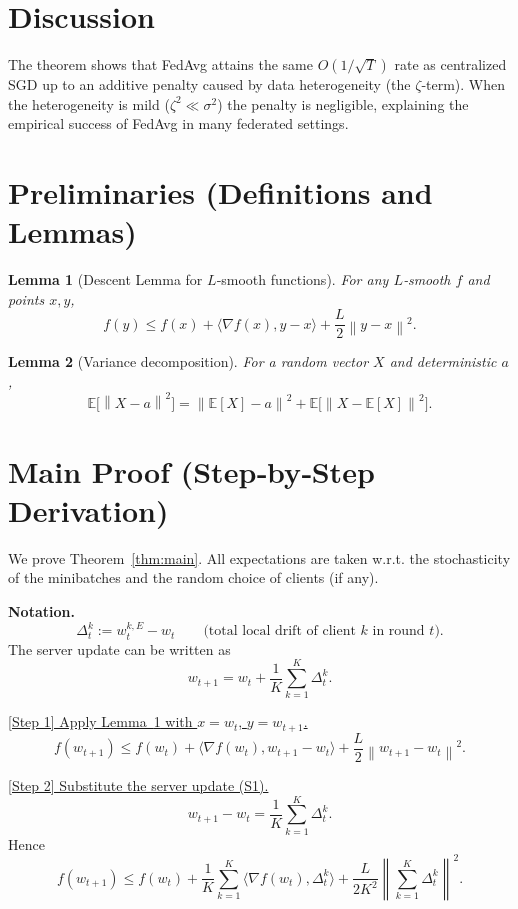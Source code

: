 \documentclass{article}
\newtheorem{lemma}{Lemma}
\newcommand{\E}{\mathbb{E}}
\newcommand{\norm}[1]{\left\|#1\right\|}
\newcommand{\ip}[2]{\langle #1,#2\rangle}
\begin{document}
\section*{Discussion}
The theorem shows that FedAvg attains the same $O(1/\sqrt{T})$ rate as centralized SGD up to an additive penalty caused by data heterogeneity (the $\zeta$‑term). When the heterogeneity is mild ($\zeta^2\ll\sigma^2$) the penalty is negligible, explaining the empirical success of FedAvg in many federated settings.

\newpage

\section*{Preliminaries (Definitions and Lemmas)}
\begin{lemma}[Descent Lemma for $L$‑smooth functions]\label{lem:descent}
For any $L$‑smooth $f$ and points $x,y$,
\[
    f(y)\le f(x)+\ip{\nabla f(x)}{y-x}+\frac{L}{2}\norm{y-x}^2 .
\]
\end{lemma}
\begin{lemma}[Variance decomposition]\label{lem:variance}
For a random vector $X$ and deterministic $a$,
\[
    \E\!\bigl[\norm{X-a}^2\bigr]=\norm{\E[X]-a}^2+\E\!\bigl[\norm{X-\E[X]}^2\bigr].
\]
\end{lemma}

\section*{Main Proof (Step‑by‑Step Derivation)}
We prove Theorem~\ref{thm:main}. All expectations are taken w.r.t. the stochasticity of the minibatches and the random choice of clients (if any).

\bigskip
\noindent\textbf{Notation.}
\[
    \Delta_t^{k}:=w_{t}^{k,E}-w_t
    \qquad\text{(total local drift of client $k$ in round $t$).}
\]
The server update can be written as
\[
    w_{t+1}=w_t+\frac{1}{K}\sum_{k=1}^{K}\Delta_t^{k}. \tag{S1}
\]

\bigskip
\noindent\underline{[Step 1] Apply Lemma~\ref{lem:descent} with $x=w_t$, $y=w_{t+1}$.}
\[
    f(w_{t+1})\le f(w_t)+\ip{\nabla f(w_t)}{w_{t+1}-w_t}
    +\frac{L}{2}\norm{w_{t+1}-w_t}^2 . \tag{1}
\]

\noindent\underline{[Step 2] Substitute the server update (S1).}
\[
    w_{t+1}-w_t = \frac{1}{K}\sum_{k=1}^{K}\Delta_t^{k}.
\]
Hence
\[
    f(w_{t+1})\le f(w_t)+\frac{1}{K}\sum_{k=1}^{K}\ip{\nabla f(w_t)}{\Delta_t^{k}}
    +\frac{L}{2K^2}\norm{\sum_{k=1}^{K}\Delta_t^{k}}^2 . \tag{2}
\]
\end{document}
